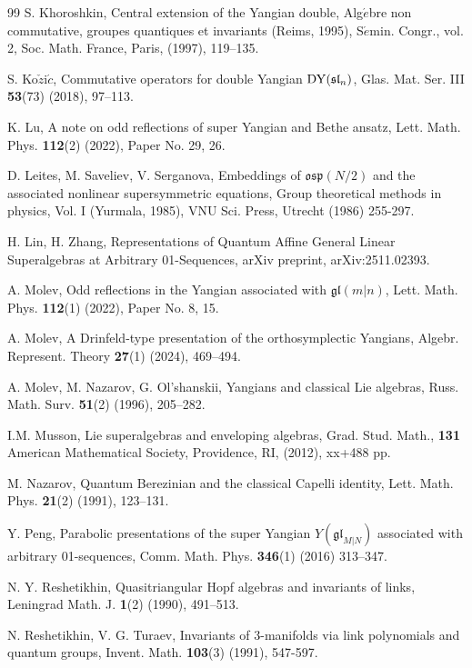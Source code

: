 \documentclass[a4paper,12pt]{article}
\numberwithin{equation}{section}
\begin{document}
\begin{thebibliography}{99}
S. Khoroshkin, Central extension of the Yangian double, Alg$\acute{e}$bre non commutative, groupes quantiques et invariants (Reims, 1995), S$\acute{e}$min. Congr., vol. 2, Soc. Math. France, Paris, (1997), 119--135.

S. Ko$\check{z}$i$\acute{c}$, Commutative operators for double Yangian ${\rm DY}(\mathfrak{sl}_n)$, Glas. Mat. Ser. III \textbf{53}(73) (2018), 97--113.

K. Lu, A note on odd reflections of super Yangian and Bethe ansatz, Lett. Math. Phys. \textbf{112}(2) (2022), Paper No. 29, 26.

D. Leites, M. Saveliev, V. Serganova, Embeddings of $\mathfrak{osp}(N/2)$ and the associated nonlinear supersymmetric equations, Group theoretical methods in physics, Vol. I (Yurmala, 1985), VNU Sci. Press, Utrecht (1986) 255-297.

H. Lin, H. Zhang, Representations of Quantum Affine General Linear Superalgebras at Arbitrary 01-Sequences, arXiv preprint, arXiv:2511.02393.

A. Molev, Odd reflections in the {Y}angian associated with $\mathfrak{gl}(m|n)$, Lett. Math. Phys. \textbf{112}(1) (2022), Paper No. 8, 15.

A. Molev, A Drinfeld-type presentation of the orthosymplectic Yangians, Algebr. Represent. Theory \textbf{27}(1) (2024), 469--494. 

A. Molev, M. Nazarov, G. Ol'shanskii, Yangians and classical Lie algebras, Russ. Math. Surv. \textbf{51}(2) (1996), 205–282.

I.M. Musson, Lie superalgebras and enveloping algebras, Grad. Stud. Math., \textbf{131} American Mathematical Society, Providence, RI, (2012), xx+488 pp.

M. Nazarov, Quantum Berezinian and the classical Capelli identity, Lett. Math. Phys. \textbf{21}(2) (1991), 123--131.

Y. Peng, Parabolic presentations of the super Yangian $Y(\mathfrak{gl}_{M|N})$ associated with arbitrary 01-sequences, Comm. Math. Phys. \textbf{346}(1) (2016) 313--347.

N. Y. Reshetikhin, Quasitriangular Hopf algebras and invariants of links, Leningrad Math. J. \textbf{1}(2) (1990), 491–513.

N. Reshetikhin, V. G. Turaev, Invariants of $3$-manifolds via link polynomials and quantum groups, Invent. Math. \textbf{103}(3) (1991), 547-597.


\end{thebibliography}
\end{document}
